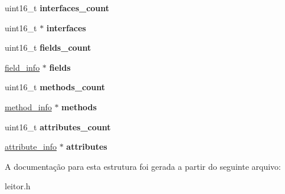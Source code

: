 \begin{DoxyCompactItemize}
\item 
\hypertarget{structClassFile_a25f384f7a9746352aad90fb499126704}{uint16\-\_\-t {\bfseries interfaces\-\_\-count}}\label{structClassFile_a25f384f7a9746352aad90fb499126704}

\item 
\hypertarget{structClassFile_a86680de028c6df386edafa8e8436b92c}{uint16\-\_\-t $\ast$ {\bfseries interfaces}}\label{structClassFile_a86680de028c6df386edafa8e8436b92c}

\item 
\hypertarget{structClassFile_a517d14b0d9e507f1485a3b6d3cb38683}{uint16\-\_\-t {\bfseries fields\-\_\-count}}\label{structClassFile_a517d14b0d9e507f1485a3b6d3cb38683}

\item 
\hypertarget{structClassFile_aa324f88c75aa96c632f8c57d010aab0c}{\hyperlink{structfield__info}{field\-\_\-info} $\ast$ {\bfseries fields}}\label{structClassFile_aa324f88c75aa96c632f8c57d010aab0c}

\item 
\hypertarget{structClassFile_a479310e3e0674d9171d24beb794fcb14}{uint16\-\_\-t {\bfseries methods\-\_\-count}}\label{structClassFile_a479310e3e0674d9171d24beb794fcb14}

\item 
\hypertarget{structClassFile_ad061f06cd709d10dbfbf82f443e43632}{\hyperlink{structmethod__info}{method\-\_\-info} $\ast$ {\bfseries methods}}\label{structClassFile_ad061f06cd709d10dbfbf82f443e43632}

\item 
\hypertarget{structClassFile_accd99ee441c45eb8fdcd3836d56e9ef4}{uint16\-\_\-t {\bfseries attributes\-\_\-count}}\label{structClassFile_accd99ee441c45eb8fdcd3836d56e9ef4}

\item 
\hypertarget{structClassFile_a8bf809db8e1008f401dc3cda5e9cdb14}{\hyperlink{structattribute__info}{attribute\-\_\-info} $\ast$ {\bfseries attributes}}\label{structClassFile_a8bf809db8e1008f401dc3cda5e9cdb14}

\end{DoxyCompactItemize}


A documentação para esta estrutura foi gerada a partir do seguinte arquivo\-:\begin{DoxyCompactItemize}
\item 
leitor.\-h\end{DoxyCompactItemize}
